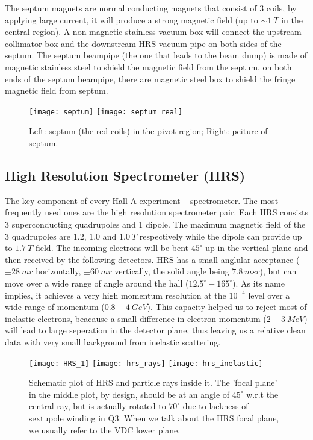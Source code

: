 The septum magnets are normal conducting magnets that consist of 3 coils, 
by applying large current, it will produce a
strong magnetic field (up to $\sim 1 \ T$ in the central region). A non-magnetic
stainless vacuum box will connect the upstream collimator box and the downstream 
HRS vacuum pipe on both sides of the septum. The septum beampipe (the one that
leads to the beam dump) is made of magnetic stainless steel to shield the
magnetic field from the septum, on both ends of the septum beampipe, there
are magnetic steel box to shield the fringe magnetic field from septum. 

\begin{figure}[h!]
    \texttt{[image: septum]}
    \texttt{[image: septum\_real]}
    \caption{Left: septum (the red coils) in the pivot region; 
    Right: pciture of septum.}
\end{figure}

\subsection{High Resolution Spectrometer (HRS)}
The key component of every Hall A experiment -- spectrometer. The most frequently
used ones are the high resolution spectrometer pair. Each HRS consists 3 superconducting
quadrupoles and 1 dipole. The maximum magnetic field of the 3 quadrupoles are
$1.2$, $1.0$ and $1.0\ T$ respectively while the dipole can provide up to $1.7\ T$ field. 
The incoming electrons will be bent $45^\circ$ up in the vertical plane and then
received by the following detectors.
HRS has a small anglular acceptance ($\pm 28\ mr$ horizontally, $\pm 60\ mr$ vertically, 
the solid angle being $7.8\ msr$), but can move over a wide range of angle
around the hall ($12.5^\circ - 165^\circ$). As its name implies, it achieves a 
very high momentum resolution at the $10^{-4}$ level over a wide range of momentum 
($0.8 - 4\ GeV$). This capacity helped us to reject most of inelastic electrons, 
beacause a small difference in electron momentum ($2-3\ MeV$) will lead to
large seperation in the detector plane, thus leaving us a relative clean data 
with very small background from inelastic scattering. 

\begin{figure}[h!]
    \centering
    \texttt{[image: HRS\_1]}
    \texttt{[image: hrs\_rays]}
    \texttt{[image: hrs\_inelastic]}
    \caption{Schematic plot of HRS and particle rays inside it. \cite{halla3d}
    The 'focal plane' in the middle plot, by design, should be at an angle of $45^\circ$
    w.r.t the central ray, but is actually rotated to $70^\circ$ due to lackness
    of sextupole winding in Q3. When we talk about the HRS focal plane, we
    usually refer to the VDC lower plane.
    }
\end{figure}

